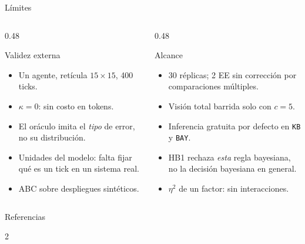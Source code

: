 \documentclass[aspectratio=169]{beamer}
\begin{document}
\begin{frame}{Límites}
  \begin{columns}[T]
    \begin{column}{0.48\textwidth}
      \begin{block}{Validez externa}
        \small
        \begin{itemize}
          \item Un agente, retícula $15\times15$, 400 ticks.
          \item $\kappa=0$: sin costo en tokens.
          \item El oráculo imita el \emph{tipo} de error, no su distribución.
          \item Unidades del modelo: falta fijar qué es un tick en un sistema
            real.
          \item ABC sobre despliegues sintéticos.
        \end{itemize}
      \end{block}
    \end{column}
    \begin{column}{0.48\textwidth}
      \begin{block}{Alcance}
        \small
        \begin{itemize}
          \item 30 réplicas; 2 EE sin corrección por comparaciones múltiples.
          \item Visión total barrida solo con $c=5$.
          \item Inferencia gratuita por defecto en \texttt{KB} y \texttt{BAY}.
          \item HB1 rechaza \emph{esta} regla bayesiana, no la decisión
            bayesiana en general.
          \item $\eta^2$ de un factor: sin interacciones.
        \end{itemize}
      \end{block}
    \end{column}
  \end{columns}
\end{frame}

\begin{frame}{Referencias}
  \nocite{russellNorvig2020,brooks1991intelligence,newell1982knowledge}
  \vspace{-0.4em}
  \setlength{\columnsep}{1.4em}
  \begin{multicols}{2}
    \printbibliography[heading=none]
  \end{multicols}
\end{frame}
\end{document}
